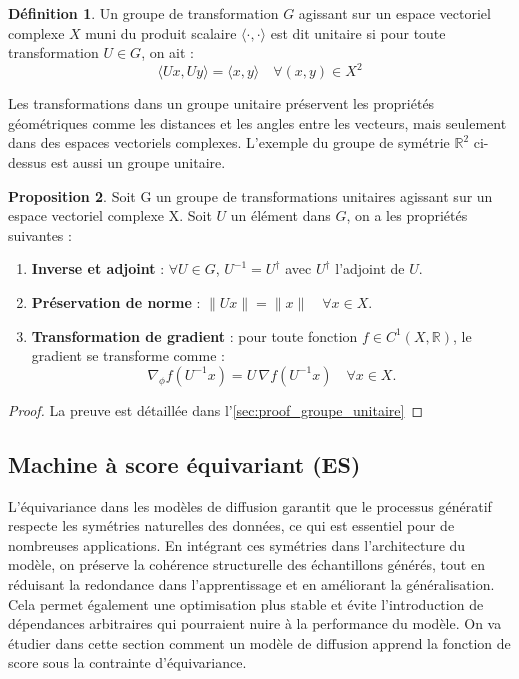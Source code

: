 \documentclass[a4paper,10pt]{article}
\theoremstyle{definition} %
\newtheorem{definition}{Définition}[section]
\theoremstyle{definition} %
\newtheorem{proposition}[definition]{Proposition}
\theoremstyle{definition} %
\theoremstyle{definition} %
\newcommand{\R}{\mathbb{R}}
\begin{document}
\begin{definition}
    Un groupe de transformation $G$ agissant sur un espace vectoriel complexe $X$ muni du produit scalaire $\langle \cdot,\cdot \rangle$ est dit unitaire si pour toute transformation $U \in G$, on ait :
    \begin{equation*}
        \langle Ux,Uy\rangle = \langle x,y\rangle \quad\forall(x,y) \in X^2
    \end{equation*}
\end{definition}

Les transformations dans un groupe unitaire préservent les propriétés géométriques comme les distances et les angles entre les vecteurs, mais seulement dans des espaces vectoriels complexes. L'exemple du groupe de symétrie $\R^2$ ci-dessus est aussi un groupe unitaire.

\begin{proposition}\label{prop:Groupe_unitaire}
    Soit G un groupe de transformations unitaires agissant sur un espace vectoriel complexe X. Soit $U$ un élément dans $G$, on a les propriétés suivantes :
    \begin{enumerate}[label=(\roman*)]
        \item \textbf{Inverse et adjoint} : $\forall U \in G$, $U^{-1} = U^\dagger$ avec $U^\dagger$ l'adjoint de $U$.
        \item \textbf{Préservation de norme} : $\|Ux\| = \|x\| \quad \forall x\in X$.
        \item \textbf{Transformation de gradient} : pour toute fonction $f \in C^1(X,\R)$, le gradient se transforme comme :
        \begin{equation*}
            \nabla_\phi f(U^{-1}x) = U\, \nabla f(U^{-1}x) \quad \forall x\in X.
        \end{equation*}
    \end{enumerate}
\end{proposition}

\begin{proof}
    La preuve est détaillée dans l'\cref{sec:proof_groupe_unitaire}
\end{proof}

\subsection{Machine à score équivariant (ES)}
L'équivariance dans les modèles de diffusion garantit que le processus génératif respecte les symétries naturelles des données, ce qui est essentiel pour de nombreuses applications. En intégrant ces symétries dans l'architecture du modèle, on préserve la cohérence structurelle des échantillons générés, tout en réduisant la redondance dans l'apprentissage et en améliorant la généralisation. Cela permet également une optimisation plus stable et évite l’introduction de dépendances arbitraires qui pourraient nuire à la performance du modèle. On va étudier dans cette section comment un modèle de diffusion apprend la fonction de score sous la contrainte d'équivariance.
\end{document}
